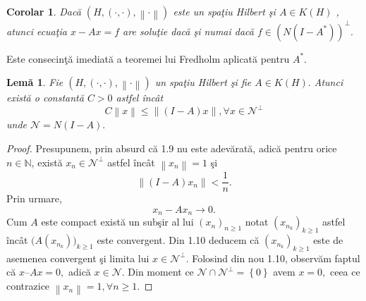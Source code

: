 \documentclass[a4paper,12pt,oneside]{report}
\newtheorem{corollary}{Corolar}
\newtheorem{lemma}{Lem\u{a}}
\begin{document}
\begin{corollary}
Dac\u{a} \(\left ( H, \left ( \cdot ,\cdot  \right ), \left \| \cdot  \right \| \right )\) este un spa\c{t}iu Hilbert \c{s}i \(A \in K\left ( H \right )\) , atunci ecua\c{t}ia \(x - Ax = f\) are solu\c{t}ie dac\u{a} \c{s}i numai dac\u{a} \(f \in \left ( N\left ( I - A^{\ast } \right ) \right )^{\perp }. \)
\end{corollary}
Este consecin\c{t}\u{a} imediat\u{a} a teoremei lui Fredholm aplicat\u{a} pentru $A^{\ast }.$
\begin{lemma}
Fie \(\left ( H, \left ( \cdot ,\cdot  \right ), \left \| \cdot  \right \| \right )\) un spa\c{t}iu Hilbert \c{s}i fie  \(A \in K\left ( H \right ).\) Atunci exist\u{a} o constant\u{a} \(C > 0\) astfel \^{i}nc\^{a}t
\begin{displaymath}
   C\left \| x \right \| \leq \left \| \left ( I - A \right )x \right \|, \forall x \in { \mathcal{N}}^{\perp } \label{eq:1.9} \tag{
   1.9}
\end{displaymath}
unde  \({ \mathcal{N}} = N \left ( I - A \right ).\)
\end{lemma}
\begin{proof}
Presupunem, prin absurd c\u{a} 1.9 nu este adev\u{a}rat\u{a}, adic\u{a} pentru orice \(n \in \mathbb{N} \), exist\u{a}  \(x_{n} \in { \mathcal{N}}^{\perp }\) astfel \^{i}nc\^{a}t \(\left \| x_{n} \right \| = 1\) \c{s}i
\begin{displaymath}
  \left \| \left ( I - A \right )x_{n} \right \| < \frac{1}{n}.
\end{displaymath}
Prin urmare,
\begin{displaymath}
  x_{n} - Ax_{n} \rightarrow 0. \label{eq:1.10} \tag{1.10}
\end{displaymath}
Cum \(A\) este compact exist\u{a} un sub\c{s}ir al lui \(\left (x_{n}  \right )_{n\geq 1} \) notat \(\left (x_{n_{k}}  \right )_{k\geq 1}\) astfel \^{i}nc\^{a}t $ \big(A(x_{n_{k}})\big)_{k\geq 1}$ este convergent. Din 1.10 deducem c\u{a} \(\left (x_{n_{k}}  \right )_{k\geq 1}\) este de asemenea convergent  \c{s}i limita lui \(x \in { \mathcal{N}}^{\perp }.\) Folosind din nou 1.10, observ\u{a}m faptul c\u{a} \(x – Ax = 0,\) adic\u{a} \(x \in { \mathcal{N}} .\) Din moment ce \({ \mathcal{N}} \cap { \mathcal{N}}^{\perp } = \left \{ 0 \right \}\) avem \(x = 0,\) ceea ce contrazice \(\left \| x_{n} \right \| = 1, \forall n\geq 1. \)
\end{proof}
\end{document}
